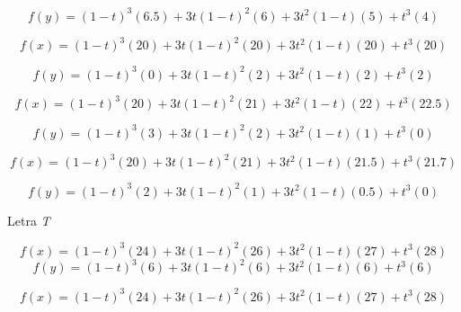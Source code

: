 \documentclass[11pt]{article}
\begin{document}
\begin{enumerate}
\begin{equation}
f(y)=(1-t)^{3}\left(6.5\right)+3t(1-t)^{2}\left(6\right)+3t^{2}(1-t)\left(5\right)+t^{3}\left(4\right)
\end{equation}

\begin{equation}
f(x) = (1-t)^{3}\left(20\right)+3t(1-t)^{2}\left(20\right)+3t^{2}(1-t)\left(20\right)+t^{3}\left(20\right)
\end{equation}

\begin{equation}
f(y) = (1-t)^{3}\left(0\right)+3t(1-t)^{2}\left(2\right)+3t^{2}(1-t)\left(2\right)+t^{3}\left(2\right)
\end{equation}

\begin{equation}
f(x) = (1-t)^{3}\left(20\right)+3t(1-t)^{2}\left(21\right)+3t^{2}(1-t)\left(22\right)+t^{3}\left(22.5\right)
\end{equation}

\begin{equation}
f(y) = (1-t)^{3}\left(3\right)+3t(1-t)^{2}\left(2\right)+3t^{2}(1-t)\left(1\right)+t^{3}\left(0\right)
\end{equation}

\begin{equation}
f(x) = (1-t)^{3}\left(20\right)+3t(1-t)^{2}\left(21\right)+3t^{2}(1-t)\left(21.5\right)+t^{3}\left(21.7\right)
\end{equation}

\begin{equation}
f(y) = (1-t)^{3}\left(2\right)+3t(1-t)^{2}\left(1\right)+3t^{2}(1-t)\left(0.5\right)+t^{3}\left(0\right)
\end{equation}

Letra \emph{T}

\begin{equation}
f(x) = (1-t)^{3}\left(24\right)+3t(1-t)^{2}\left(26\right)+3t^{2}(1-t)\left(27\right)+t^{3}\left(28\right)
\end{equation}
\begin{equation}
f(y) = (1-t)^{3}\left(6\right)+3t(1-t)^{2}\left(6\right)+3t^{2}(1-t)\left(6\right)+t^{3}\left(6\right)
\end{equation}

\begin{equation}
f(x) = (1-t)^{3}\left(24\right)+3t(1-t)^{2}\left(26\right)+3t^{2}(1-t)\left(27\right)+t^{3}\left(28\right)
\end{equation}


\end{enumerate}
\end{document}
